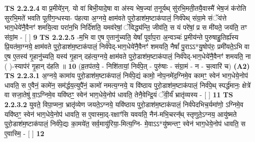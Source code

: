 \documentclass[17pt]{extarticle}
\begin{document}
                  \newline
                                \textbf{ TS 2.2.2.4} \newline
                  वा प्र॒मीये॑र॒न्. यो वा॑ बिभी॒यादे॒षा वा अ॑स्य भेष॒ज्या॑ त॒नूर्यथ् सु॑रभि॒मती॒तयै॒वास्मै॑ भेष॒जं क॑रोति सुरभि॒मते॑ भवति पूतीग॒न्धस्या- प॑हत्या अ॒ग्नये॒ क्षाम॑वते पुरो॒डाश॑म॒ष्टाक॑पालं॒ निर्व॑पेथ् संग्रा॒मे संॅय॑त्ते भाग॒धेये॑नै॒वैनꣳ॑ शमयि॒त्वा परा॑न॒भि निर्दि॑शति॒ यमव॑रेषां॒ ॅविद्ध्य॑न्ति॒ जीव॑ति॒ स यं परे॑षां॒ प्र स मी॑यते॒ जय॑ति॒ तꣳ स॑ग्रां॒म - [  ] \textbf{  9} \newline
                  \newline
                                \textbf{ TS 2.2.2.5} \newline
                  -म॒भि वा ए॒ष ए॒तानु॑च्यति॒ येषां᳚ पूर्वाप॒रा अ॒न्वञ्चः॑ प्र॒मीय॑न्ते पुरुषाहु॒तिर्ह्य॑स्य प्रि॒यत॑मा॒ग्नये॒ क्षाम॑वते पुरो॒डाश॑म॒ष्टाक॑पालं॒ निर्व॑पेद्-भाग॒धेये॑नै॒वैनꣳ॑ शमयति॒ नैषां᳚ पु॒राऽऽ*यु॒षोप॑रः॒ प्रमी॑यते॒ऽभि वा ए॒ष ए॒तस्य॑ गृ॒हानु॑च्यति॒ यस्य॑ गृ॒हान् दह॑त्य॒ग्नये॒ क्षाम॑वते पुरो॒डाश॑म॒ष्टाक॑पालं॒ निर्व॑पेद्-भाग॒धेये॑नै॒वैनꣳ॑ शमयति॒ ना ( )-स्याप॑रं गृ॒हान् द॑हति ॥ \textbf{  10 } \newline
                  \newline
                      (व्र॒तप॑तये॒ - निशि॑तायां॒ निर्व॑पे॒त् - पुरु॑षाः - संग्रा॒मं - न - च॒त्वारि॑ च)  \textbf{(A2)} \newline \newline
                                        \textbf{ TS 2.2.3.1} \newline
                  अ॒ग्नये॒ कामा॑य पुरो॒डाश॑म॒ष्टाक॑पालं॒ निर्व॑पे॒द्यं कामो॒ नोप॒नमे॑द॒ग्निमे॒व कामꣳ॒॒ स्वेन॑ भाग॒धेये॒नोप॑ धावति॒ स ए॒वैनं॒ कामे॑न॒ सम॑र्द्धय॒त्युपै॑नं॒ कामो॑ नमत्य॒ग्नये॒ य वि॑ष्ठाय पुरो॒डाश॑म॒ष्टाक॑पालं॒ निर्व॑पे॒थ् स्पर्द्ध॑मानः॒ क्षेत्रे॑ वा सजा॒तेषु॑ वा॒ऽग्निमे॒व यवि॑ष्ठꣳ॒॒ स्वेन॑ भाग॒धेये॒नोप॑ धावति॒ तेनै॒वेन्द्रि॒यं ॅवी॒र्यं॑ भ्रातृ॑व्यस्य - [  ] \textbf{  11} \newline
                  \newline
                                \textbf{ TS 2.2.3.2} \newline
                  युवते॒ विपा॒प्मना॒ भ्रातृ॑व्येण जयते॒ऽग्नये॒ यवि॑ष्ठाय पुरो॒डाश॑म॒ष्टाक॑पालं॒ निर्व॑पेदभिच॒र्यमा॑णो॒ ऽग्निमे॒व यवि॑ष्ठꣳ॒॒ स्वेन॑ भाग॒धेये॒नोप॑ धावति॒ स ए॒वास्मा॒द्-रक्षाꣳ॑सि यवयति॒ नैन॑-मभि॒चरन्᳚थ् स्तृणुते॒ऽग्नय॒ आयु॑ष्मते पुरो॒डाश॑म॒ष्टाक॑पालं॒ निर्व॑पे॒द्यः का॒मये॑त॒ सर्व॒मायु॑रिया॒-मित्य॒ग्नि- मे॒वाऽऽ*यु॑ष्मन्तꣳ॒॒ स्वेन॑ भाग॒धेये॒नोप॑ धावति॒ स ए॒वास्मि॒ - [  ] \textbf{  12} \newline
\end{document}
